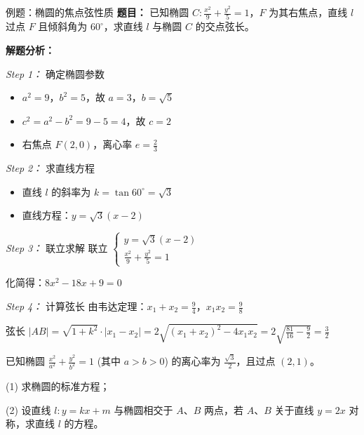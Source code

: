\documentclass{ctexart}
\newcommand{\result}[1]{\tcbhighmath[colback=deepblue!15, colframe=deepblue, arc=3pt]{#1}}
\begin{document}
\begin{exampleBox}{例题：椭圆的焦点弦性质}
\textbf{题目：} 已知椭圆 $C: \frac{x^2}{9} + \frac{y^2}{5} = 1$，$F$ 为其右焦点，直线 $l$ 过点 $F$ 且倾斜角为 $60^\circ$，求直线 $l$ 与椭圆 $C$ 的交点弦长。

\medskip
\textbf{解题分析：}

\textit{Step 1：} 确定椭圆参数
\begin{itemize}[leftmargin=15pt, itemsep=4pt]
    \item $a^2 = 9$，$b^2 = 5$，故 $a = 3$，$b = \sqrt{5}$
    \item $c^2 = a^2 - b^2 = 9 - 5 = 4$，故 $c = 2$
    \item 右焦点 $F(2, 0)$，离心率 $e = \frac{2}{3}$
\end{itemize}

\textit{Step 2：} 求直线方程
\begin{itemize}[leftmargin=15pt, itemsep=4pt]
    \item 直线 $l$ 的斜率为 $k = \tan 60^\circ = \sqrt{3}$
    \item 直线方程：$y = \sqrt{3}(x - 2)$
\end{itemize}

\textit{Step 3：} 联立求解
联立 $\begin{cases} y = \sqrt{3}(x - 2) \\ \frac{x^2}{9} + \frac{y^2}{5} = 1 \end{cases}$

化简得：$8x^2 - 18x + 9 = 0$

\textit{Step 4：} 计算弦长
由韦达定理：$x_1 + x_2 = \frac{9}{4}$，$x_1 x_2 = \frac{9}{8}$

弦长 $|AB| = \sqrt{1 + k^2} \cdot |x_1 - x_2| = 2\sqrt{(x_1 + x_2)^2 - 4x_1 x_2} = 2\sqrt{\frac{81}{16} - \frac{9}{2}} = \frac{3}{2}$

\result{\textbf{答案：}弦长为 \frac{3}{2}}
\end{exampleBox}

\begin{exercisebox}{4.1}
已知椭圆 $\frac{x^2}{a^2} + \frac{y^2}{b^2} = 1$ (其中 $a > b > 0$) 的离心率为 $\frac{\sqrt{3}}{2}$，且过点 $(2, 1)$。

(1) 求椭圆的标准方程；

(2) 设直线 $l: y = kx + m$ 与椭圆相交于 $A$、$B$ 两点，若 $A$、$B$ 关于直线 $y = 2x$ 对称，求直线 $l$ 的方程。
\end{exercisebox}
\end{document}
